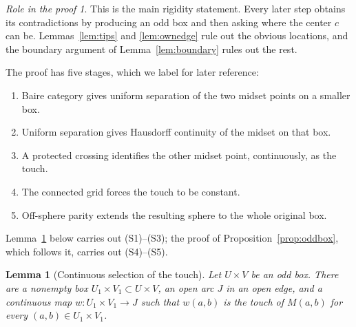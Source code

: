 \documentclass[11pt]{amsart}
\newtheorem{lemma}[theorem]{Lemma}
\theoremstyle{definition}
\theoremstyle{remark}
\newtheorem*{role}{Role in the proof}
\newcommand{\M}{M}
\begin{document}
\begin{role}
This is the main rigidity statement. Every later step obtains its contradictions by producing an odd box and then asking where the center $c$ can be. Lemmas~\ref{lem:tips} and \ref{lem:ownedge} rule out the obvious locations, and the boundary argument of Lemma~\ref{lem:boundary} rules out the rest.
\end{role}

The proof has five stages, which we label for later reference:
\begin{enumerate}[label=\textup{(S\arabic*)},leftmargin=*]
\item Baire category gives uniform separation of the two midset points on a smaller box.
\item Uniform separation gives Hausdorff continuity of the midset on that box.
\item A protected crossing identifies the other midset point, continuously, as the touch.
\item The connected grid forces the touch to be constant.
\item Off-sphere parity extends the resulting sphere to the whole original box.
\end{enumerate}
Lemma~\ref{lem:selection} below carries out (S1)--(S3); the proof of Proposition~\ref{prop:oddbox}, which follows it, carries out (S4)--(S5).

\begin{lemma}[Continuous selection of the touch]\label{lem:selection}
Let $U\times V$ be an odd box. There are a nonempty box $U_1\times V_1\subset U\times V$, an open arc $J$ in an open edge, and a continuous map $w:U_1\times V_1\to J$ such that $w(a,b)$ is the touch of $\M(a,b)$ for every $(a,b)\in U_1\times V_1$.
\end{lemma}
\end{document}
